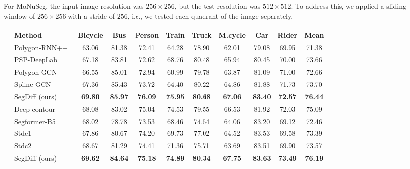 \documentclass[10pt,twocolumn,letterpaper]{article}
\begin{document}
For MoNuSeg, the input image resolution was $256 \times 256$, but the test resolution was $512 \times 512$. To address this, we applied a sliding window of $256 \times 256$ with a stride of $256$, i.e., we tested each quadrant of the image separately. 

\begin{table*}[t]
\centering
\hspace{-0.2cm}
 \begin{tabular}{c l c c c c c c c c c }
 \midrule
 & \multicolumn{1}{l}{Method} & \multicolumn{1}{c}{Bicycle} & \multicolumn{1}{c}{Bus} & \multicolumn{1}{c}{Person} & \multicolumn{1}{c}{Train} & \multicolumn{1}{c}{Truck} & \multicolumn{1}{c}{M.cycle} & \multicolumn{1}{c}{Car} &  \multicolumn{1}{c}{Rider} & \multicolumn{1}{c}{Mean}\\
 \midrule
 \parbox[t]{3mm}{} 
& Polygon-RNN++~\cite{acuna2018efficient}
& 63.06 & 81.38 & 72.41 & 64.28 & 78.90 & 62.01 & 79.08 & 69.95 & 71.38 \\
& PSP-DeepLab~\cite{chen2017deeplab}
& 67.18 & 83.81 & 72.62 & 68.76 & 80.48 & 65.94 & 80.45 & 70.00 & 73.66 \\
& Polygon-GCN~\cite{ling2019fast}
& 66.55 & 85.01 & 72.94 & 60.99 & 79.78 & 63.87 & 81.09 & 71.00 & 72.66 \\
& Spline-GCN~\cite{ling2019fast}
& 67.36 & 85.43 & 73.72 & 64.40 & 80.22 & 64.86 & 81.88 & 71.73 & 73.70 \\
& SegDiff (ours)
& \textbf{69.80} & \textbf{85.97} & \textbf{76.09} & \textbf{75.95} & \textbf{80.68} & \textbf{67.06} & \textbf{83.40} & \textbf{72.57} & \textbf{76.44} \\
\midrule
\midrule
& Deep contour~\cite{gur2019end}
& 68.08 & 83.02 & 75.04 & 74.53 & 79.55 & 66.53 & 81.92 & 72.03 & 75.09 \\
& Segformer-B5~\cite{xie2021segformer}
& 68.02 & 78.78 & 73.53 & 68.46 & 74.54 & 64.06 & 83.20 & 69.12 & 72.46 \\
& Stdc1~\cite{fan2021rethinking}
& 67.86 & 80.67 & 74.20 & 69.73 & 77.02 & 64.52 & 83.53 & 69.58 & 73.39 \\
& Stdc2~\cite{fan2021rethinking}
& 68.67 & 81.29 & 74.41 & 71.36 & 75.71 & 63.69 & 83.51 & 69.90 & 73.57 \\
& SegDiff (ours)
& \textbf{69.62} & \textbf{84.64} & \textbf{75.18} & \textbf{74.89} & \textbf{80.34} & \textbf{67.75} & \textbf{83.63} & \textbf{73.49} & \textbf{76.19} \\
\midrule
 \end{tabular}
\label{tab:cityscapes}
\vspace{-3mm}
\end{table*}
\end{document}
